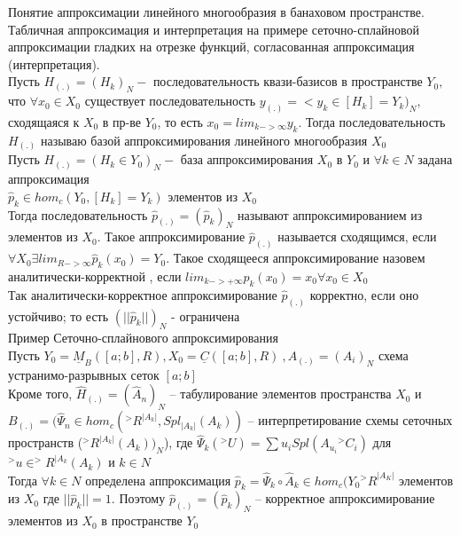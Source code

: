 \documentclass[__main__.tex]{subfiles}
\begin{document}
Понятие аппроксимации линейного многообразия в банаховом пространстве. Табличная аппроксимация и интерпретация на примере сеточно-сплайновой аппроксимации гладких на отрезке функций, согласованная аппроксимация (интерпретация).\\

Пусть $H_{(.)} = (H_k)_N - $ последовательность квази-базисов в пространстве $Y_0,$ что $\forall x_0\in X_0$ существует последовательность $y_{(.)}=<y_k\in [H_k]=Y_k)_N,$ сходящаяся к $X_0$ в пр-ве $Y_0$, то есть $x_0=lim_{k->\infty}y_k.$ Тогда последовательность $H_{(.)}$ называю базой аппроксимирования линейного многообразия $X_0$ \\

Пусть $H_{(.)}=(H_k \in Y_0)_N - $ база аппроксимирования $X_0$ в $Y_0$  и $\forall k \in N$ задана аппроксимация\\
$\hat{p}_k \in hom_c (Y_0,[H_k]=Y_k)$ элементов из $X_0$\\
Тогда последовательность $\hat{p}_{(.)}=(\hat{p}_k)_N $ называют аппроксимированием из элементов из $X_0$. Такое аппроксимирование  $\hat{p}_{(.)}$ называется сходящимся, если $\forall X_0 \exists lim_{R->\infty} \hat{p}_k (x_0) = Y_0$. Такое сходящееся аппроксимирование назовем аналитически-корректной , если $lim_{k->+\infty}\hat{p}_k(x_0)=x_0 \forall x_0\in X_0$\\
Так аналитически-корректное аппроксимирование $\hat{p}_{(.)}$ корректно, если оно устойчиво; то есть $(||\hat{p}_k||)_N$ - ограничена\\

Пример Сеточно-сплайнового аппроксимирования \\
Пусть $Y_0=\underline{M}_B([a;b],R),X_0=\underline{C}([a;b],R) \ ,A_{(.)}=(A_i)_N$ схема устранимо-разрывных сеток $[a;b]$\\
Кроме того, $\hat{H}_{(.)}=(\hat{A}_n)_N$ -- табулирование элементов пространства $X_0$ и \\$B_{(.)}=(\hat{\Psi}_n\in hom_c(^>R^{|A_k|},Spl_{|A_k|}(A_k))$ -- интерпретирование схемы сеточных пространств ($^>R^{|A_k|}(A_k))_N$), где $\hat{\Psi}_k(^>U)=\sum u_i Spl(A_{u_i}{^>C}_i)	$ для $^>u\in ^>R^{|A_k}(A_k)$  и  $k\in N$\\
Тогда $\forall k\in N$ определена аппроксимация $\hat{p}_k=\hat{\Psi}_k \circ \hat{A}_k \in hom_c(Y_0{^>R}^{|A_K|}$ элементов из $X_0$	где $||\hat{p}_k||=1$. Поэтому $\hat{p}_{(.)}=(\hat{p}_k)_N$ -- корректное аппроксимирование элементов из $X_0$  в пространстве $Y_0$\\
\end{document}
